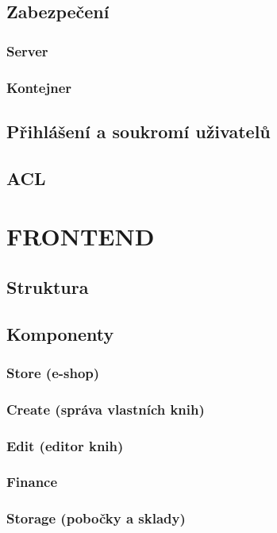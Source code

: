 \documentclass[a4paper,12pt,twoside,BCOR=10mm]{article}
\newcommand{\upc}[1]{\uppercase{#1}} %
\begin{document}
\subsection{Zabezpečení}
\subsubsection{Server}
\subsubsection{Kontejner}
\subsection{Přihlášení a soukromí uživatelů}
\subsection{ACL}

\section{\upc{Frontend}}\label{sec:frontend}
\subsection{Struktura}
\subsection{Komponenty}

\subsubsection{Store (e-shop)}\label{sec:store}
\subsubsection{Create (správa vlastních knih)}\label{sec:create}
\subsubsection{Edit (editor knih)}\label{sec:edit}
\subsubsection{Finance}\label{sec:finance}
\subsubsection{Storage (pobočky a sklady)}\label{sec:storage}
\end{document}
